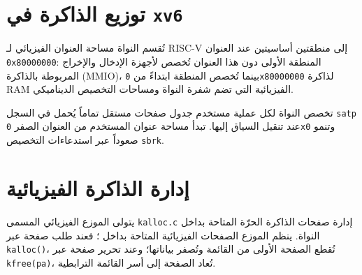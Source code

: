 \section{توزيع الذاكرة في \texttt{xv6}}

تُقسم النواة مساحة العنوان الفيزيائي لـ RISC-V إلى منطقتين أساسيتين عند العنوان \texttt{0x80000000}:
المنطقة الأولى دون هذا العنوان تُخصص لأجهزة الإدخال والإخراج المربوطة بالذاكرة (MMIO)،
بينما تُخصص المنطقة ابتداءً من \texttt{0x80000000} لذاكرة RAM الفيزيائية التي تضم شفرة النواة ومساحات التخصيص الديناميكي.

تخصص النواة لكل عملية مستخدم جدول صفحات مستقل تماماً يُحمل في السجل \texttt{satp} عند تنقيل السياق إليها.
تبدأ مساحة عنوان المستخدم من العنوان الصفر \texttt{0x0} وتنمو صعوداً عبر استدعاءات التخصيص \texttt{sbrk}.

\section{إدارة الذاكرة الفيزيائية}

يتولى الموزع الفيزيائي المسمى \texttt{kalloc.c} إدارة صفحات الذاكرة الحرّة المتاحة بداخل النواة.
ينظم الموزع الصفحات الفيزيائية المتاحة بداخل ؛
فعند طلب صفحة عبر \texttt{kalloc()}، تُقطع الصفحة الأولى من القائمة وتُصفر بياناتها؛
وعند تحرير صفحة عبر \texttt{kfree(pa)}، تُعاد الصفحة إلى أسر القائمة الترابطية.
